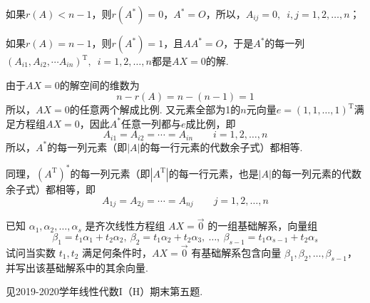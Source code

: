 \begin{exercise}
\begin{exgroup}
\begin{answer}
          如果$r(A)<n-1$，则$r(A^*)=0$，$A^*=O$，所以，$A_{ij}=0,\enspace i,j=1,2,\ldots,n$；

          如果$r(A)=n-1$，则$r(A^*)=1$，且$AA^*=O$，于是$A^*$的每一列$(A_{i1},A_{i2},\cdots A_{in})^\mathrm{T},\enspace i=1,2,\ldots,n$都是$AX=0$的解.

          由于$AX=0$的解空间的维数为
          \[ n-r(A)=n-(n-1)=1 \]
          所以，$AX=0$的任意两个解成比例. 又元素全部为1的$n$元向量$e=(1,1,\ldots,1)^\mathrm{T}$满足方程组$AX=0$，因此$A^*$任意一列都与$e$成比例，即
          \[ A_{i1}=A_{i2}=\cdots=A_{in} \qquad i=1,2,\ldots,n \]
          所以，$A^*$的每一列元素（即$|A|$的每一行元素的代数余子式）都相等.

          同理，$(A^\mathrm{T})^*$的每一列元素（即$|A^\mathrm{T}|$的每一行元素，也是$|A|$的每一列元素的代数余子式）都相等，即
          \[ A_{1j}=A_{2j}=\cdots=A_{nj} \qquad j=1,2,\ldots,n \]
        \end{answer}

        \item 已知 $\alpha_1,\alpha_2,\ldots,\alpha_s$ 是齐次线性方程组 $AX=\vec{0}$ 的一组基础解系，向量组
        \[\beta_1=t_1\alpha_1+t_2\alpha_2,\ \beta_2=t_1\alpha_2+t_2\alpha_3,\ \ldots,\ \beta_{s-1}=t_1\alpha_{s-1}+t_2\alpha_s\]
        试问当实数 $t_1,t_2$ 满足何条件时，$AX=\vec{0}$ 有基础解系包含向量 $\beta_1,\beta_2,\ldots,\beta_{s-1}$，并写出该基础解系中的其余向量.
        \begin{answer}
            见2019-2020学年线性代数I（H）期末第五题.
        \end{answer}


\end{exgroup}
\end{exercise}
